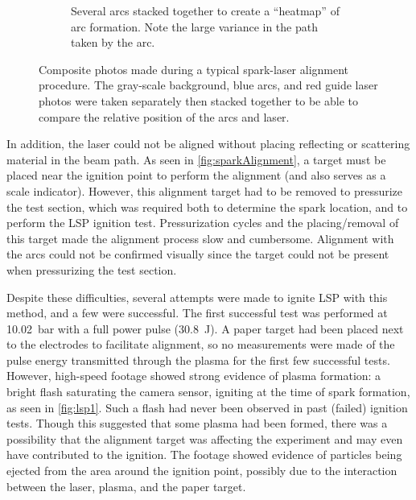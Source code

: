 \begin{figure}[h]
\begin{subfigure}[t]{0.47\textwidth}
                    \caption{Several arcs stacked together to create a ``heatmap'' of arc formation. Note the large variance in the path taken by the arc.}
                    \label{fig:sparkAlignment_heatmap}
                \end{subfigure}
                \caption[Composite photos made during a typical spark-laser alignment procedure]{Composite photos made during a typical spark-laser alignment procedure. The gray-scale background, blue arcs, and red guide laser photos were taken separately then stacked together to be able to compare the relative position of the arcs and laser.}
                \label{fig:sparkAlignment}
            \end{figure}

            In addition, the laser could not be aligned without placing reflecting or scattering material in the beam path. As seen in \autoref{fig:sparkAlignment}, a target must be placed near the ignition point to perform the alignment (and also serves as a scale indicator). However, this alignment target had to be removed to pressurize the test section, which was required both to determine the spark location, and to perform the LSP ignition test. Pressurization cycles and the placing/removal of this target made the alignment process slow and cumbersome. Alignment with the arcs could not be confirmed visually since the target could not be present when pressurizing the test section.

            Despite these difficulties, several attempts were made to ignite LSP with this method, and a few were successful. The first successful test was performed at \qty{10.02}{bar} with a full power pulse (\qty{30.8}{J}). A paper target had been placed next to the electrodes to facilitate alignment, so no measurements were made of the pulse energy transmitted through the plasma for the first few successful tests. However, high-speed footage showed strong evidence of plasma formation: a bright flash saturating the camera sensor, igniting at the time of spark formation, as seen in \autoref{fig:lsp1}. Such a flash had never been observed in past (failed) ignition tests. Though this suggested that some plasma had been formed, there was a possibility that the alignment target was affecting the experiment and may even have contributed to the ignition. The footage showed evidence of particles being ejected from the area around the ignition point, possibly due to the interaction between the laser, plasma, and the paper target.

